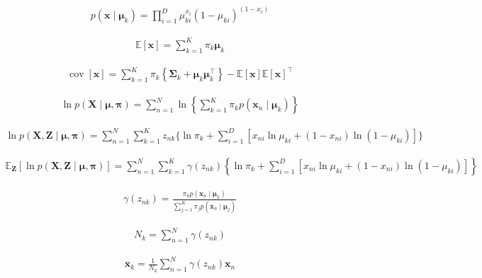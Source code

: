 \documentclass{article}
\begin{document}
\begin{align*}
p\left(\mathbf{x} \mid \boldsymbol{\mu}_{k}\right)=\prod_{i=1}^{D} \mu_{k i}^{x_{i}}\left(1-\mu_{k i}\right)^{\left(1-x_{i}\right)} 
\tag{15.38}
\end{align*}

\begin{align*}
\mathbb{E}[\mathbf{x}]=\sum_{k=1}^{K} \pi_{k} \boldsymbol{\mu}_{k} 
\tag{15.39}
\end{align*}

\begin{align*}
\operatorname{cov}[\mathbf{x}]=\sum_{k=1}^{K} \pi_{k}\left\{\boldsymbol{\Sigma}_{k}+\boldsymbol{\mu}_{k} \boldsymbol{\mu}_{k}^{\top}\right\}-\mathbb{E}[\mathbf{x}]\mathbb{E}[\mathbf{x}]^{\top}
\tag{15.40}
\end{align*}

\begin{align*}
\ln p(\mathbf{X} \mid \boldsymbol{\mu}, \boldsymbol{\pi})=\sum_{n=1}^{N} \ln \left\{\sum_{k=1}^{K} \pi_{k} p\left(\mathbf{x}_{n} \mid \boldsymbol{\mu}_{k}\right)\right\} 
\tag{15.41}
\end{align*}

\begin{align*}
\ln p(\mathbf{X}, \mathbf{Z} \mid \boldsymbol{\mu}, \boldsymbol{\pi}) = \sum_{n=1}^{N} \sum_{k=1}^{K} z_{n k}\bigg\{\ln \pi_{k} + \sum_{i=1}^{D}\left[x_{n i} \ln \mu_{k i}+\left(1-x_{n i}\right) \ln \left(1-\mu_{k i}\right)\right]\bigg\}
\tag{15.44}
\end{align*}

\begin{align*}
\mathbb{E}_{\mathbf{Z}}[\ln p(\mathbf{X}, \mathbf{Z} \mid \boldsymbol{\mu}, \boldsymbol{\pi})]=\sum_{n=1}^{N} \sum_{k=1}^{K} \gamma\left(z_{n k}\right)\left\{\ln \pi_{k}+\sum_{i=1}^{D}\left[x_{n i} \ln \mu_{k i}+\left(1-x_{n i}\right) \ln \left(1-\mu_{k i}\right)\right]\right\} 
\tag{15.45}
\end{align*}

\begin{align*}
\gamma\left(z_{n k}\right)=\frac{\pi_{k} p\left(\mathbf{x}_{n} \mid \boldsymbol{\mu}_{k}\right)}{\sum_{j=1}^{K} \pi_{j} p\left(\mathbf{x}_{n} \mid \boldsymbol{\mu}_{j}\right)} 
\tag{15.46}
\end{align*}

\begin{align*}
N_{k} =\sum_{n=1}^{N} \gamma\left(z_{n k}\right) 
\tag{15.47}
\end{align*}

\begin{align*}
\overline{\mathbf{x}}_{k} =\frac{1}{N_{k}} \sum_{n=1}^{N} \gamma\left(z_{n k}\right) \mathbf{x}_{n} 
\tag{15.48}
\end{align*}
\end{document}
